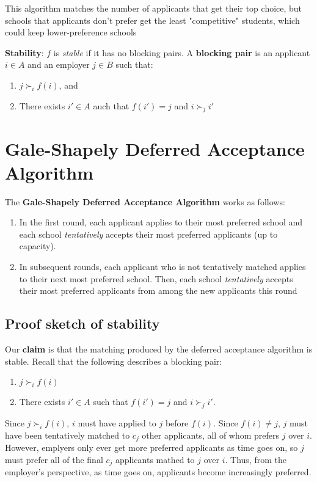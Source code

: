 \documentclass[titlepage, 12pt, leqno]{article}
\begin{document}
This algorithm matches the number of applicants that get their top choice, but 
schools that applicants don't prefer get the least "competitive" students, which
could keep lower-preference schools

\begin{definition}
    \textbf{Stability}: $f$ is \textit{stable} if it has no blocking pairs. A
    \textbf{blocking pair} is an applicant $i \in A$ and an employer $j \in B$
    such that:
    \begin{enumerate}
        \item $j \succ_i f(i)$, and
        \item There exists $i' \in A$ auch that $f(i')=j$ and $i\succ_ji'$
    \end{enumerate}
\end{definition}

\pagebreak
\section{Gale-Shapely Deferred Acceptance Algorithm}
The \textbf{Gale-Shapely Deferred Acceptance Algorithm} works as follows:
\begin{enumerate}
    \item In the first round, each applicant applies to their most preferred
        school and each school \textit{tentatively} accepts their most
        preferred applicants (up to capacity).
    \item In subsequent rounds, each applicant who is not tentatively matched
        applies to their next most preferred school. Then, each school 
        \textit{tentatively} accepts their most preferred applicants from
        among the new applicants this round 
\end{enumerate}

\subsection{Proof sketch of stability}
Our \textbf{claim }is that the matching produced by the deferred acceptance
algorithm is stable. Recall that the following describes a blocking pair:
\begin{enumerate}
    \item $j \succ_i f(i)$
    \item There exists $i'\in A$ such that $f(i') = j$ and $i \succ_j i'$.
\end{enumerate}
Since $j \succ_i f(i)$, $i$ must have applied to $j$ before $f(i)$. Since 
$f(i) \ne j$, $j$ must have been tentatively matched to $c_j$ other applicants,
all of whom prefers $j$ over $i$. However, emplyers only ever get more
preferred applicants as time goes on, so $j$ must prefer all of the final $c_j$
applicants mathed to $j$ over $i$. Thus, from the employer's perspective, as time
goes on, applicants become increasingly preferred.
\end{document}
